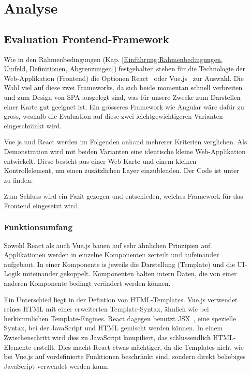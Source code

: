 
\section{Analyse}
\label{Analyse}


\subsection{Evaluation Frontend-Framework}
\label{Analyse:Evaluation Frontend-Framework}

Wie in den Rahmenbedingungen (Kap. \ref{Einführung:Rahmenbedingungen, Umfeld, Definitionen, Abgrenzungen}) festgehalten stehen für die Technologie der Web-Applikation (Frontend) die Optionen React~\cite{react} oder Vue.js~\cite{vuejs} zur Auswahl.
Die Wahl viel auf diese zwei Frameworks, da sich beide momentan schnell verbreiten und zum Design von \ac{SPA} ausgelegt sind, was für unsere Zwecke zum Darstellen einer Karte gut geeignet ist.
Ein grösseres Framework wie Angular wäre dafür zu gross, weshalb die Evaluation auf diese zwei leichtgewichtigeren Varianten eingeschränkt wird.

Vue.js und React werden im Folgenden anhand mehrerer Kriterien verglichen.
Als Demonstration wird mit beiden Varianten eine identische kleine Web-Applikation entwickelt.
Diese besteht aus einer Web-Karte und einem kleinen Kontrollelement, um einen zusätzlichen Layer einzublenden.
Der Code ist unter~\cite{github:playground} zu finden.

Zum Schluss wird ein Fazit gezogen und entschieden, welches Framework für das Frontend eingesetzt wird.

\subsubsection{Funktionsumfang}
\label{Analyse Framework:Funktionsumfang}

Sowohl React als auch Vue.js bauen auf sehr ähnlichen Prinzipien auf.
Applikationen werden in einzelne Komponenten zerteilt und aufeinander aufgebaut.
In einer Komponente is jeweils die Darstellung (Template) und die UI-Logik miteinander gekoppelt.
Komponenten halten intern Daten, die von einer anderen Komponente bedingt verändert werden können.

Ein Unterschied liegt in der Defintion von HTML-Templates.
Vue.js verwendet reines HTML mit einer erweiterten Template-Syntax, ähnlich wie bei herkömmlichen Template-Engines.
React dagegen benutzt JSX~\cite{jsx}, eine spezielle Syntax, bei der JavaScript und HTML gemischt werden können.
In einem Zwischenschritt wird dies zu JavaScript kompiliert, das schlussendlich HTML-Elemente erstellt.
Dies macht React etwas mächtiger, da die Templates nicht wie bei Vue.js auf vordefinierte Funktionen beschränkt sind, sondern direkt beliebiges JavaScript verwendet werden kann.

